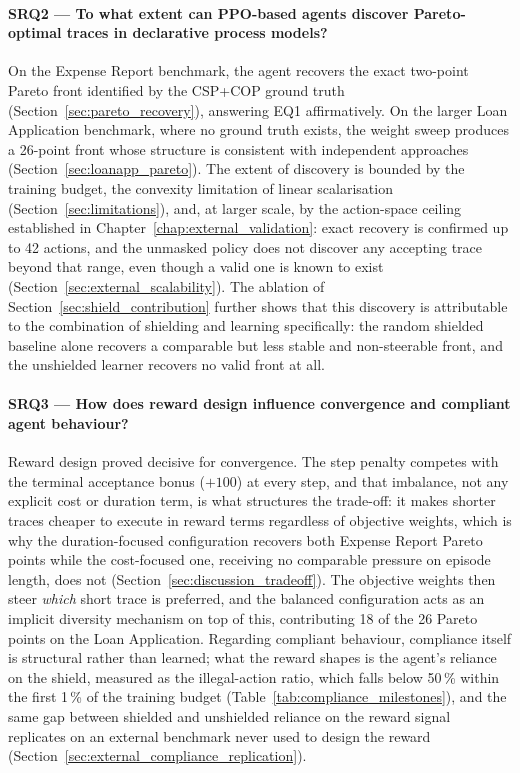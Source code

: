 \paragraph{SRQ2 --- To what extent can \ac{PPO}-based agents discover Pareto-optimal traces in declarative process models?} On the Expense Report benchmark, the agent recovers the exact two-point Pareto front identified by the CSP+COP ground truth (Section~\ref{sec:pareto_recovery}), answering EQ1 affirmatively. On the larger Loan Application benchmark, where no ground truth exists, the weight sweep produces a 26-point front whose structure is consistent with independent approaches (Section~\ref{sec:loanapp_pareto}). The extent of discovery is bounded by the training budget, the convexity limitation of linear scalarisation (Section~\ref{sec:limitations}), and, at larger scale, by the action-space ceiling established in Chapter~\ref{chap:external_validation}: exact recovery is confirmed up to 42 actions, and the unmasked policy does not discover any accepting trace beyond that range, even though a valid one is known to exist (Section~\ref{sec:external_scalability}). The ablation of Section~\ref{sec:shield_contribution} further shows that this discovery is attributable to the combination of shielding and learning specifically: the random shielded baseline alone recovers a comparable but less stable and non-steerable front, and the unshielded learner recovers no valid front at all.

\paragraph{SRQ3 --- How does reward design influence convergence and compliant agent behaviour?} Reward design proved decisive for convergence. The step penalty competes with the terminal acceptance bonus ($+100$) at every step, and that imbalance, not any explicit cost or duration term, is what structures the trade-off: it makes shorter traces cheaper to execute in reward terms regardless of objective weights, which is why the duration-focused configuration recovers both Expense Report Pareto points while the cost-focused one, receiving no comparable pressure on episode length, does not (Section~\ref{sec:discussion_tradeoff}). The objective weights then steer \emph{which} short trace is preferred, and the balanced configuration acts as an implicit diversity mechanism on top of this, contributing 18 of the 26 Pareto points on the Loan Application. Regarding compliant behaviour, compliance itself is structural rather than learned; what the reward shapes is the agent's reliance on the shield, measured as the illegal-action ratio, which falls below 50\,\% within the first 1\,\% of the training budget (Table~\ref{tab:compliance_milestones}), and the same gap between shielded and unshielded reliance on the reward signal replicates on an external benchmark never used to design the reward (Section~\ref{sec:external_compliance_replication}).

